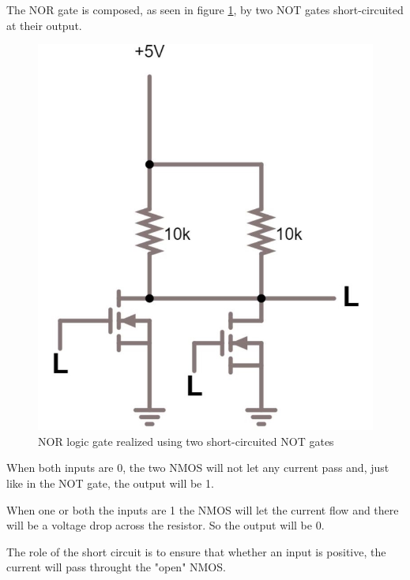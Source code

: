 \documentclass{article}
\begin{document}
The NOR gate is composed, as seen in figure \ref{NOR_NMOS}, by two NOT gates short-circuited at their output.

\begin{figure}[h]
    \centering
    \includegraphics[scale=.3]{IM_NOR_NMOS.JPG}
    \caption{NOR logic gate realized using two short-circuited NOT gates}
    \label{NOR_NMOS}
\end{figure}

When both inputs are 0, the two NMOS will not let any current pass and, just like in the NOT gate, the output will be 1.

\vspace{1mm}

When one or both the inputs are 1 the NMOS will let the current flow and there will be a voltage drop across the resistor. So the output will be 0.

\vspace{1mm}

The role of the short circuit is to ensure that whether an input is positive, the current will pass throught the "open" NMOS.

\vspace{3mm}
\end{document}
